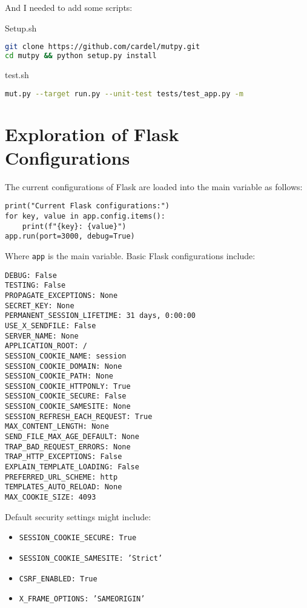 \documentclass[12pt, letterpaper,twocolumn]{article}
\theoremstyle{remark}
\theoremstyle{definition}
\begin{document}
And I needed to add some scripts:

Setup.sh

\begin{lstlisting}[language=bash]
git clone https://github.com/cardel/mutpy.git
cd mutpy && python setup.py install
\end{lstlisting} 

test.sh


\begin{lstlisting}[language=bash]
mut.py --target run.py --unit-test tests/test_app.py -m
\end{lstlisting} 

\section{Exploration of Flask Configurations}

The current configurations of Flask are loaded into the main variable as follows:

\begin{lstlisting}
print("Current Flask configurations:")
for key, value in app.config.items():
    print(f"{key}: {value}")
app.run(port=3000, debug=True)
\end{lstlisting}

Where \texttt{app} is the main variable. Basic Flask configurations include:

\begin{lstlisting}
DEBUG: False
TESTING: False
PROPAGATE_EXCEPTIONS: None
SECRET_KEY: None
PERMANENT_SESSION_LIFETIME: 31 days, 0:00:00
USE_X_SENDFILE: False
SERVER_NAME: None
APPLICATION_ROOT: /
SESSION_COOKIE_NAME: session
SESSION_COOKIE_DOMAIN: None
SESSION_COOKIE_PATH: None
SESSION_COOKIE_HTTPONLY: True
SESSION_COOKIE_SECURE: False
SESSION_COOKIE_SAMESITE: None
SESSION_REFRESH_EACH_REQUEST: True
MAX_CONTENT_LENGTH: None
SEND_FILE_MAX_AGE_DEFAULT: None
TRAP_BAD_REQUEST_ERRORS: None
TRAP_HTTP_EXCEPTIONS: False
EXPLAIN_TEMPLATE_LOADING: False
PREFERRED_URL_SCHEME: http
TEMPLATES_AUTO_RELOAD: None
MAX_COOKIE_SIZE: 4093
\end{lstlisting}

Default security settings might include:

\begin{itemize}
    \item \texttt{SESSION\_COOKIE\_SECURE: True}
    \item \texttt{SESSION\_COOKIE\_SAMESITE: 'Strict'}
    \item \texttt{CSRF\_ENABLED: True}
    \item \texttt{X\_FRAME\_OPTIONS: 'SAMEORIGIN'}
\end{itemize}
\end{document}
